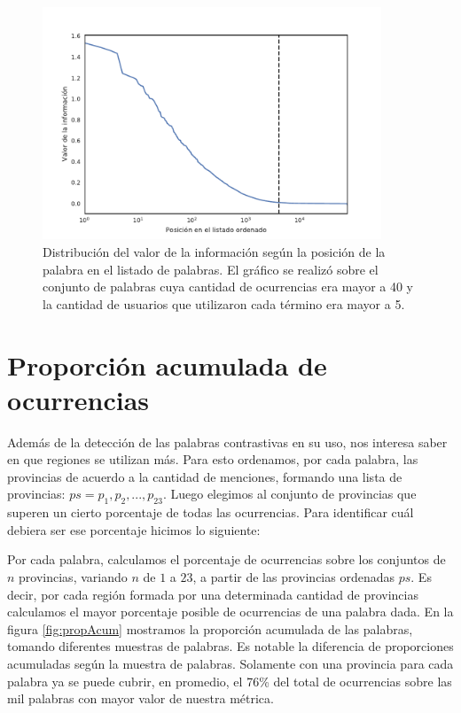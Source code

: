 \begin{figure}
\centering
\includegraphics[width=0.9\textwidth]{./images/train/conFiltro/valorInformacionCorte.pdf}
\caption{Distribución del valor de la información según la posición de la palabra en el listado de palabras. El gráfico se realizó sobre el conjunto de palabras cuya cantidad de ocurrencias era mayor a 40 y la cantidad de usuarios que utilizaron cada término era mayor a 5. } 
\label{fig:ivalue}
\end{figure}


\section{Proporción acumulada de ocurrencias} %
\label{proporcionDeOcurrencias}
Además de la detección de las palabras contrastivas en su uso, nos interesa saber en que regiones se utilizan más. Para esto ordenamos, por cada palabra, las provincias de acuerdo a la cantidad de menciones, formando una lista de provincias: $ps = p_1,p_2,...,p_{23}$. Luego elegimos al conjunto de provincias que superen un cierto porcentaje de todas las ocurrencias. Para identificar cuál debiera ser ese porcentaje hicimos lo siguiente:

Por cada palabra, calculamos el porcentaje de ocurrencias sobre los conjuntos de $n$ provincias, variando $n$ de $1$ a $23$, a partir de las provincias ordenadas $ps$. Es decir, por cada región formada por una determinada cantidad de provincias calculamos el mayor porcentaje posible de ocurrencias de una palabra dada.
En la figura \ref{fig:propAcum} mostramos la proporción acumulada de las palabras, tomando diferentes muestras de palabras. Es notable la diferencia de proporciones acumuladas según la muestra de palabras. Solamente con una provincia para cada palabra ya se puede cubrir, en promedio, el 76\% del total de ocurrencias sobre las mil palabras con mayor valor de nuestra métrica.

